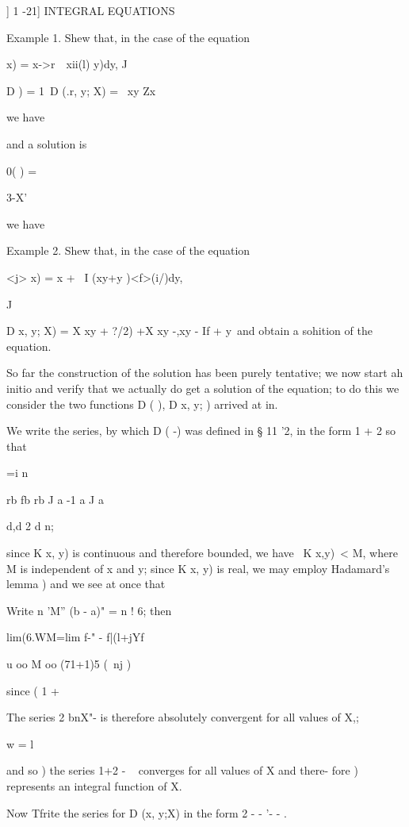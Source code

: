 ] 1 -21] INTEGRAL EQUATIONS

Example 1. Shew that, in the case of the equation

  x) = x->r\ \ xii(l) y)dy, J

D ) = 1\, D (.r, y; X) = \ xy Zx

%
%

we have

and a solution is

0( ) =

3-X'

we have

Example 2. Shew that, in the case of the equation

<j> x) = x + \ I (xy+y )<f>(i/)dy,

J

D x, y; X) = X xy + ?/2) +X xy -,xy - If + y\ and obtain a sohition
of the equation.


So far the construction of the solution has been purely tentative; we
now start ah initio and verify that we actually do get a solution of
the equation; to do this we consider the two functions D ( ), D x,
y; ) arrived at in.

We write the series, by which D ( -) was defined in § 11 '2, in the
form 1 + 2 so that

 =i n\

rb fb rb J a -1 a J a

d,d 2  d n;

since K x, y) is continuous and therefore bounded, we have \ K x,y)\ <
M, where M is independent of x and y; since K x, y) is real, we may
employ Hadamard's lemma ) and we see at once that

Write n 'M'' (b - a)" = n ! 6; then

lim(6.WM=lim f-" - f|(l+jYf

u oo M oo (71+1)5 (\ nj )

since ( 1 +

The series 2 bnX"- is therefore absolutely convergent for all values
of X,;

w = l

and so ) the series 1+2 - ~ converges for all values of X and
there- fore ) represents an integral function of X.

Now Tfrite the series for D (x, y;X) in the form 2 - - '- - .

